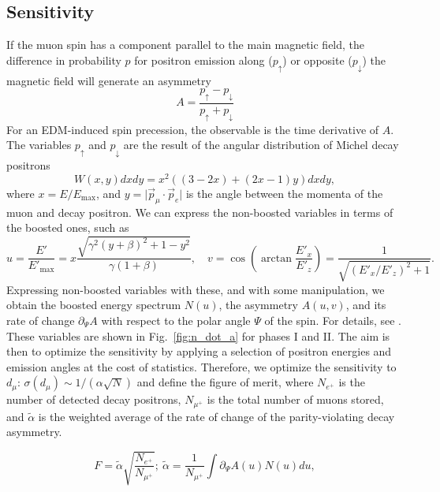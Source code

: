 \begin{refsection}
\section{Sensitivity}
\label{muEDM:sensitivity}
    If the muon spin has a component parallel to the main magnetic field, the difference in probability $p$ for positron emission along ($p_\uparrow$) or opposite ($p_\downarrow$) the magnetic field will generate an asymmetry
    \begin{equation}
        A = \frac{p_\uparrow - p_\downarrow}{p_\uparrow + p_\downarrow}
    \label{eq:asym_theory}
    \end{equation}        
    For an EDM-induced spin precession, the observable is the time derivative of $A$.
    The variables $p_\uparrow$ and $p_\downarrow$ are the result of the angular distribution of Michel decay positrons
    \begin{equation}
        W(x, y)dxdy = x^2 \left((3-2x) + (2x - 1)y\right)dxdy,
    \end{equation}
    where $x = E/E_\mathrm{max}$, and $y = \lvert \vec p_\mu \cdot \vec p_e \rvert$ is the angle between the momenta of the muon and decay positron. 
    We can express the non-boosted variables in terms of the boosted ones, such as
    \begin{equation}
	u = \frac{E'}{E'_\mathrm{max}} = x\frac{\sqrt{\gamma^2 (y+\beta)^2 + 1 - y^2}}{\gamma(1+\beta)},\quad
	v = \cos\left(\arctan\frac{E'_x}{E'_z}\right) = \frac{1}{\sqrt{(E'_x/E'_z)^2 + 1}}.
    \end{equation}
    Expressing non-boosted variables with these, and with some manipulation, we obtain the boosted energy spectrum $N(u)$, the asymmetry $A(u, v)$, and its rate of change $\partial_\Psi A$ with respect to the polar angle $\Psi$ of the spin.
    For details, see \cite{chavdar:2023}.
    These variables are shown in Fig.~\ref{fig:n_dot_a} for phases I and II.
    \noindent
    The aim is then to optimize the sensitivity by applying a selection of positron energies and emission angles at the cost of statistics. Therefore, we optimize the sensitivity to $d_\mu$: $\sigma(d_\mu) \sim 1/(\alpha\sqrt{N})$ and define the figure of merit, where $N_{e^+}$ is the number of detected decay positrons, $N_{\mu^+}$ is the total number of muons stored, and $\tilde\alpha$ is the weighted average of the rate of change of the parity-violating decay asymmetry. 

    \begin{equation}
	F = \tilde\alpha \sqrt{\frac{N_{e^+}}{N_{\mu^+}}}; \ 
    \tilde\alpha = \frac{1}{N_{\mu^+}} \int \partial_\Psi A(u) N(u)
	du,
	\label{eq:figure_of_merit}
    \end{equation}


\end{refsection}
